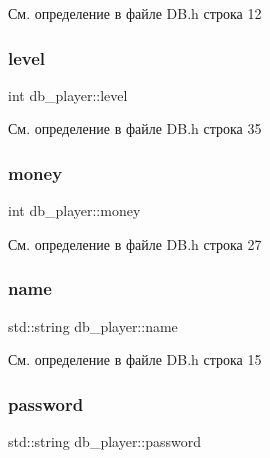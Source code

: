 См. определение в файле D\+B.\+h строка 12

\mbox{\label{structdb__player_a87ec3fa495482d1018974f2694430156}} 
\subsubsection{\texorpdfstring{level}{level}}
{\footnotesize\ttfamily int db\+\_\+player\+::level}



См. определение в файле D\+B.\+h строка 35

\mbox{\label{structdb__player_a11f7c74a3d7b7f6c91f5ac6823c848af}} 
\subsubsection{\texorpdfstring{money}{money}}
{\footnotesize\ttfamily int db\+\_\+player\+::money}



См. определение в файле D\+B.\+h строка 27

\mbox{\label{structdb__player_a182fb42d16b91d5dccc9c640bc649521}} 
\subsubsection{\texorpdfstring{name}{name}}
{\footnotesize\ttfamily std\+::string db\+\_\+player\+::name}



См. определение в файле D\+B.\+h строка 15

\mbox{\label{structdb__player_a44fb2105fb4d116447eee76a5494821d}} 
\subsubsection{\texorpdfstring{password}{password}}
{\footnotesize\ttfamily std\+::string db\+\_\+player\+::password}



